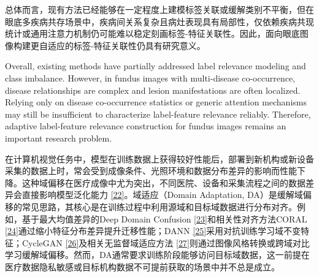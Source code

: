 总体而言，现有方法已经能够在一定程度上建模标签关联或缓解类别不平衡，但在眼底多疾病共存场景中，疾病间关系复杂且病灶表现具有局部性，仅依赖疾病共现统计或通用注意力机制仍可能难以稳定刻画标签-特征关联性。因此，面向眼底图像构建更自适应的标签-特征关联性仍具有研究意义。

Overall, existing methods have partially addressed label relevance modeling and class imbalance. However, in fundus images with multi-disease co-occurrence, disease relationships are complex and lesion manifestations are often localized. Relying only on disease co-occurrence statistics or generic attention mechanisms may still be insufficient to characterize label-feature relevance reliably. Therefore, adaptive label-feature relevance construction for fundus images remains an important research problem.

\label{b.ux57dfux9002ux5e94ux57dfux6cdbux5316ux4e0eux5355ux57dfux6cdbux5316}


在计算机视觉任务中，模型在训练数据上获得较好性能后，部署到新机构或新设备采集的数据上时，常会受到成像条件、光照环境和数据分布差异的影响而性能下降。这种域偏移在医疗成像中尤为突出，不同医院、设备和采集流程之间的数据差异会直接影响模型泛化能力 \hyperref[_Ref213949439]{{[}22{]}}。域适应（Domain Adaptation, DA）是缓解域偏移的常见思路，其核心是在训练过程中利用源域和目标域数据进行分布对齐。例如，基于最大均值差异的Deep Domain Confusion \hyperref[_Ref213949448]{{[}23{]}}和相关性对齐方法CORAL \hyperref[_Ref213949453]{{[}24{]}}通过缩小特征分布差异提升迁移性能；DANN \hyperref[_Ref213949479]{{[}25{]}}采用对抗训练学习域不变特征；CycleGAN \hyperref[_Ref213949490]{{[}26{]}}及相关无监督域适应方法 \hyperref[_Ref213949530]{{[}27{]}}则通过图像风格转换或跨域对比学习缓解域偏移。然而，DA通常要求训练阶段能够访问目标域数据，这一前提在医疗数据隐私敏感或目标机构数据不可提前获取的场景中并不总是成立。

